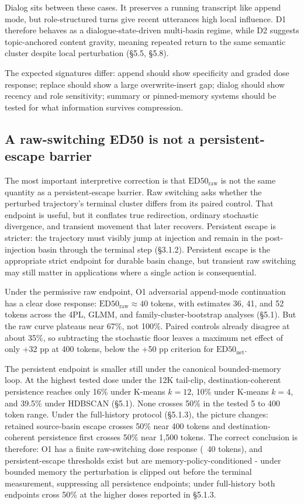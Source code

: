 \documentclass{article}
\theoremstyle{plain}
\theoremstyle{definition}
\begin{document}
Dialog sits between these cases. It preserves a running transcript like append mode, but role-structured turns give recent utterances high local influence. D1 therefore behaves as a dialogue-state-driven multi-basin regime, while D2 suggests topic-anchored content gravity, meaning repeated return to the same semantic cluster despite local perturbation (§5.5, §5.8).

The expected signatures differ: append should show specificity and graded dose response; replace should show a large overwrite-insert gap; dialog should show recency and role sensitivity; summary or pinned-memory systems should be tested for what information survives compression.

\subsection{A raw-switching ED50 is not a persistent-escape barrier}

The most important interpretive correction is that \(\mathrm{ED50}_{\mathrm{raw}}\) is not the same quantity as a persistent-escape barrier. Raw switching asks whether the perturbed trajectory's terminal cluster differs from its paired control. That endpoint is useful, but it conflates true redirection, ordinary stochastic divergence, and transient movement that later recovers. Persistent escape is stricter: the trajectory must visibly jump at injection and remain in the post-injection basin through the terminal step (§3.1.2). Persistent escape is the appropriate strict endpoint for durable basin change, but transient raw switching may still matter in applications where a single action is consequential.

Under the permissive raw endpoint, O1 adversarial append-mode continuation has a clear dose response: \(\mathrm{ED50}_{\mathrm{raw}} \approx 40\) tokens, with estimates 36, 41, and 52 tokens across the 4PL, GLMM, and family-cluster-bootstrap analyses (§5.1). But the raw curve plateaus near 67\%, not 100\%. Paired controls already disagree at about 35\%, so subtracting the stochastic floor leaves a maximum net effect of only +32 pp at 400 tokens, below the +50 pp criterion for \(\mathrm{ED50}_{\mathrm{net}}\).

The persistent endpoint is smaller still under the canonical bounded-memory loop. At the highest tested dose under the 12K tail-clip, destination-coherent persistence reaches only 16\% under K-means \(k=12\), 10\% under K-means \(k=4\), and 39.5\% under HDBSCAN (§5.1). None crosses 50\% in the tested 5 to 400 token range. Under the full-history protocol (§5.1.3), the picture changes: retained source-basin escape crosses 50\% near 400 tokens and destination-coherent persistence first crosses 50\% near 1,500 tokens. The correct conclusion is therefore: O1 has a finite raw-switching dose response (~40 tokens), and persistent-escape thresholds exist but are memory-policy-conditioned - under bounded memory the perturbation is clipped out before the terminal measurement, suppressing all persistence endpoints; under full-history both endpoints cross 50\% at the higher doses reported in §5.1.3.
\end{document}
